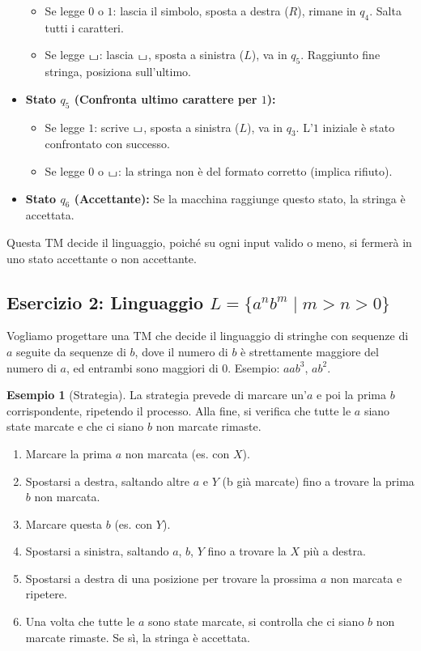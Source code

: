 \documentclass[a4paper]{article}
\theoremstyle{definition} %
\newtheorem{example}{Esempio}
\newcommand{\blankS}{\ensuremath{\raisebox{-0.15ex}{\scalebox{1.3}[0.7]{$\sqcup$}}}}
\begin{document}
\begin{itemize}
    \begin{itemize}
        \item Se legge $0$ o $1$: lascia il simbolo, sposta a destra ($R$), rimane in $q_4$. Salta tutti i caratteri.
        \item Se legge \blankS: lascia \blankS, sposta a sinistra ($L$), va in $q_5$. Raggiunto fine stringa, posiziona sull'ultimo.
    \end{itemize}
    \item \textbf{Stato $q_5$ (Confronta ultimo carattere per $1$):}
    \begin{itemize}
        \item Se legge $1$: scrive \blankS, sposta a sinistra ($L$), va in $q_3$. L'$1$ iniziale è stato confrontato con successo.
        \item Se legge $0$ o \blankS: la stringa non è del formato corretto (implica rifiuto).
    \end{itemize}
    \item \textbf{Stato $q_6$ (Accettante):} Se la macchina raggiunge questo stato, la stringa è accettata.
\end{itemize}
Questa TM decide il linguaggio, poiché su ogni input valido o meno, si fermerà in uno stato accettante o non accettante.

\subsection{Esercizio 2: Linguaggio $L = \{a^n b^m \mid m > n > 0\}$}

Vogliamo progettare una TM che decide il linguaggio di stringhe con sequenze di $a$ seguite da sequenze di $b$, dove il numero di $b$ è strettamente maggiore del numero di $a$, ed entrambi sono maggiori di $0$. Esempio: $aab^{3}$, $ab^{2}$.

\begin{example}[Strategia]
La strategia prevede di marcare un'$a$ e poi la prima $b$ corrispondente, ripetendo il processo. Alla fine, si verifica che tutte le $a$ siano state marcate e che ci siano $b$ non marcate rimaste.
\begin{enumerate}
    \item Marcare la prima $a$ non marcata (es. con $X$).
    \item Spostarsi a destra, saltando altre $a$ e $Y$ (b già marcate) fino a trovare la prima $b$ non marcata.
    \item Marcare questa $b$ (es. con $Y$).
    \item Spostarsi a sinistra, saltando $a$, $b$, $Y$ fino a trovare la $X$ più a destra.
    \item Spostarsi a destra di una posizione per trovare la prossima $a$ non marcata e ripetere.
    \item Una volta che tutte le $a$ sono state marcate, si controlla che ci siano $b$ non marcate rimaste. Se sì, la stringa è accettata.
\end{enumerate}
\end{example}
\end{document}
